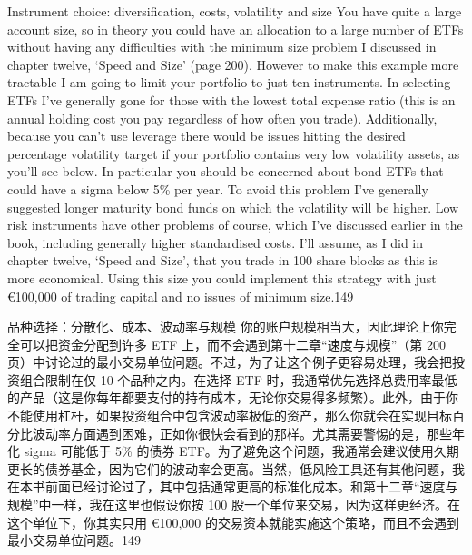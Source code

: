 
\begin{englishblock} Instrument choice: diversification, costs, volatility and size You have quite a large account size, so in theory you could have an allocation to a large number of ETFs without having any difficulties with the minimum size problem I discussed in chapter twelve, ‘Speed and Size' (page 200). However to make this example more tractable I am going to limit your portfolio to just ten instruments. In selecting ETFs I've generally gone for those with the lowest total expense ratio (this is an annual holding cost you pay regardless of how often you trade). Additionally, because you can't use leverage there would be issues hitting the desired percentage volatility target if your portfolio contains very low volatility assets, as you'll see below. In particular you should be concerned about bond ETFs that could have a sigma below 5\% per year. To avoid this problem I've generally suggested longer maturity bond funds on which the volatility will be higher. Low risk instruments have other problems of course, which I've discussed earlier in the book, including generally higher standardised costs. I'll assume, as I did in chapter twelve, ‘Speed and Size', that you trade in 100 share blocks as this is more economical. Using this size you could implement this strategy with just €100,000 of trading capital and no issues of minimum size.149 \end{englishblock}

\begin{chineseblock}品种选择：分散化、成本、波动率与规模 你的账户规模相当大，因此理论上你完全可以把资金分配到许多 ETF 上，而不会遇到第十二章“速度与规模”（第 200 页）中讨论过的最小交易单位问题。不过，为了让这个例子更容易处理，我会把投资组合限制在仅 10 个品种之内。在选择 ETF 时，我通常优先选择总费用率最低的产品（这是你每年都要支付的持有成本，无论你交易得多频繁）。此外，由于你不能使用杠杆，如果投资组合中包含波动率极低的资产，那么你就会在实现目标百分比波动率方面遇到困难，正如你很快会看到的那样。尤其需要警惕的是，那些年化 sigma 可能低于 5\% 的债券 ETF。为了避免这个问题，我通常会建议使用久期更长的债券基金，因为它们的波动率会更高。当然，低风险工具还有其他问题，我在本书前面已经讨论过了，其中包括通常更高的标准化成本。和第十二章“速度与规模”中一样，我在这里也假设你按 100 股一个单位来交易，因为这样更经济。在这个单位下，你其实只用 €100,000 的交易资本就能实施这个策略，而且不会遇到最小交易单位问题。149 \end{chineseblock}

